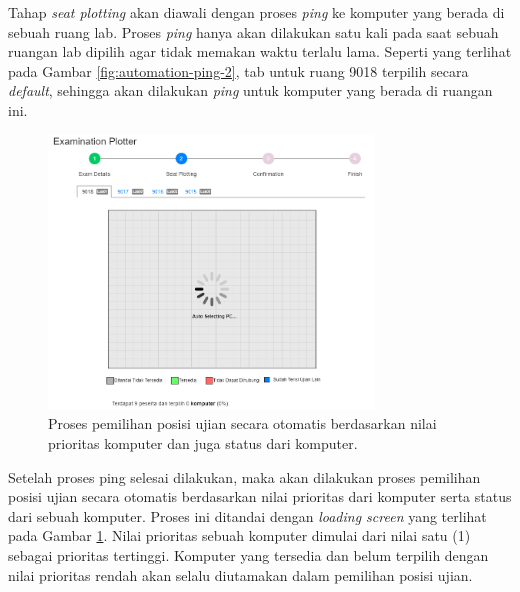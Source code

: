 \documentclass[a4paper,twoside]{article}
\begin{document}
\begin{enumerate}
\begin{itemize}
\begin{itemize}
		        Tahap \textit{seat plotting} akan diawali dengan proses \textit{ping} ke komputer yang berada di sebuah ruang lab. Proses \textit{ping} hanya akan dilakukan satu kali pada saat sebuah ruangan lab dipilih  agar tidak memakan waktu terlalu lama. Seperti yang terlihat pada Gambar \ref{fig:automation-ping-2}, tab untuk ruang 9018 terpilih secara \textit{default}, sehingga akan dilakukan \textit{ping} untuk komputer yang berada di ruangan ini.
		        
                \begin{figure}[H]
                    \centering
                    \includegraphics[width=0.77\textwidth]{images/ui designs/automation/step-2-2-autoselect-2.png}
                    \caption{Proses pemilihan posisi ujian secara otomatis berdasarkan nilai prioritas komputer dan juga status dari komputer.}
                    \label{fig:automation-autoselect-2}
                \end{figure}
		        
		        Setelah proses ping selesai dilakukan, maka akan dilakukan proses pemilihan posisi ujian secara otomatis berdasarkan nilai prioritas dari komputer serta status dari sebuah komputer. Proses ini ditandai dengan \textit{loading screen} yang terlihat pada Gambar \ref{fig:automation-autoselect-2}. Nilai prioritas sebuah komputer dimulai dari nilai satu (1) sebagai prioritas tertinggi. Komputer yang tersedia dan belum terpilih dengan nilai prioritas rendah akan selalu diutamakan dalam pemilihan posisi ujian. 
		        

\end{itemize}
\end{itemize}
\end{enumerate}
\end{document}

